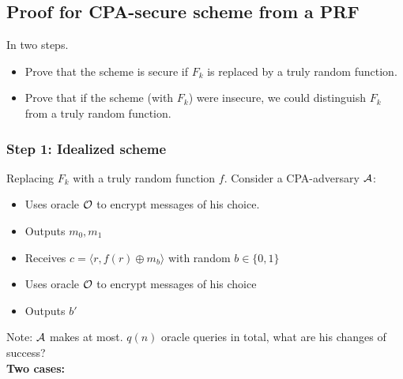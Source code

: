 \documentclass[12pt]{article}
\begin{document}
\subsection{Proof for CPA-secure scheme from a PRF}
In two steps.
\begin{itemize}
\item Prove that the scheme is secure if $F_k$ is replaced by a truly random function.
\item Prove that if the scheme (with $F_k$) were insecure, we could distinguish $F_k$ from a truly random function.
\end{itemize}

\subsubsection{Step 1: Idealized scheme}
Replacing $F_k$ with a truly random function $f$. Consider a CPA-adversary $\mathcal{A}$:
\begin{itemize}
\item Uses oracle $\mathcal{O}$ to encrypt messages of his choice.
\item Outputs $m_0,m_1$
\item Receives $c = \langle r,f(r)\oplus m_b \rangle$ with random $b \in \{0,1\}$
\item Uses oracle $\mathcal{O}$ to encrypt messages of his choice
\item Outputs $b'$
\end{itemize}
Note: $\mathcal{A}$ makes at most. $q(n)$ oracle queries in total, what are his changes of success?\\
\textbf{Two cases:}
\end{document}
